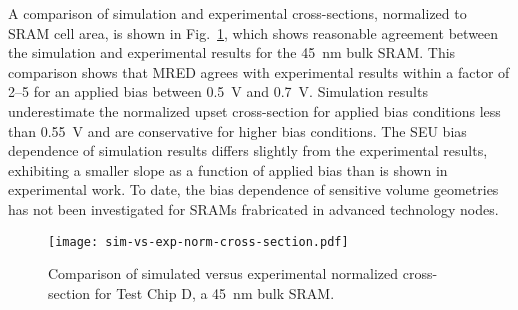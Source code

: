 A comparison of simulation and experimental cross-sections, normalized to SRAM cell area, is shown in Fig.~\ref{fig:sim-vs-exp-norm-cross-section}, which shows reasonable agreement between the simulation and experimental results for the 45~nm bulk SRAM.
This comparison shows that MRED agrees with experimental results within a factor of 2--5 for an applied bias between 0.5~V and 0.7~V.
Simulation results underestimate the normalized upset cross-section for applied bias conditions less than 0.55~V and are conservative for higher bias conditions.
The SEU bias dependence of simulation results differs slightly from the experimental results, exhibiting a smaller slope as a function of applied bias than is shown in experimental work. 
To date, the bias dependence of sensitive volume geometries has not been investigated for SRAMs frabricated in advanced technology nodes.

\begin{figure}[tb]
    \begin{center}
        \texttt{[image: sim-vs-exp-norm-cross-section.pdf]}
    \end{center}
    \caption{Comparison of simulated versus experimental normalized cross-section for Test Chip D, a 45~nm bulk SRAM.}
    \label{fig:sim-vs-exp-norm-cross-section}
\end{figure}


